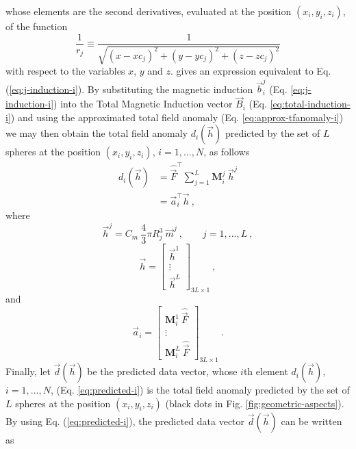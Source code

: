 \documentclass[journal abbreviation, npg]{copernicus}
\begin{document}
whose elements are the second derivatives, evaluated at the position $(x_{i}, y_{i}, z_{i})$, of the function
\begin{equation}
\dfrac{1}{r_{j}} \equiv 
\dfrac{1}{\sqrt{(x - xc_{j})^{2} + 
				(y - yc_{j})^{2} +
				(z - zc_{j})^{2}}}
\label{eq:1/rj}
\end{equation}
with respect to the variables $x$, $y$ and $z$. \citet{blakely1996} gives an expression equivalent to Eq. (\ref{eq:j-induction-i}). By substituting the magnetic induction $\vec{b}^{j}_{i}$ (Eq. \ref{eq:j-induction-i}) into the Total Magnetic Induction vector $\vec{B}_i$ (Eq. \ref{eq:total-induction-i}) and using the approximated total field anomaly (Eq. \ref{eq:approx-tfanomaly-i}) we may then obtain the total field anomaly $d_{i}(\vec{h})$ predicted by the set of $L$ spheres at the position $(x_{i}, y_{i}, z_{i})$, $i = 1, ..., N$, as follows
\begin{equation}
\begin{array}{cl}
d_{i}(\vec{h}) & 
= \hat{\vec{F}}^{\intercal} \sum_{j = 1}^{L} \mathbf{M}_{i}^{j} \: \vec{h}^{j} \\
&
= \vec{a}_{i}^{\intercal} \vec{h} \: ,
\end{array}
\label{eq:predicted-i}
\end{equation}
where
\begin{equation}
\vec{h}^{j} = C_{m} \: \dfrac{4}{3} \pi R_{j}^{3} \: \vec{m}^{j} \: ,
\qquad j = 1, ..., L \: ,
\label{eq:hj}
\end{equation}
\begin{equation}
\vec{h} = 
\left[
\begin{array}{c}
\vec{h}^{1} \\
\vdots \\
\vec{h}^{L}
\end{array}
\right]_{3L \times 1} \: ,
\label{eq:h}
\end{equation}
and
\begin{equation}
\vec{a}_{i} = 
\left[
\begin{array}{c}
\mathbf{M}_{i}^{1} \: \hat{\vec{F}} \\
\vdots \\
\mathbf{M}_{i}^{L} \: \hat{\vec{F}}
\end{array}
\right]_{3L \times 1} \: .
\label{eq:ai}
\end{equation}
Finally, let $\vec{d}(\vec{h})$ be the predicted data vector, whose $i$th element $d_{i}(\vec{h})$, $i = 1, ..., N$, (Eq. \ref{eq:predicted-i}) is the total field anomaly predicted by the set of $L$ spheres at the position $(x_{i}, y_{i}, z_{i})$ (black dots in Fig. \ref{fig:geometric-aspects}). By using Eq. (\ref{eq:predicted-i}), the predicted data vector $\vec{d}(\vec{h})$ can be written as
\end{document}
